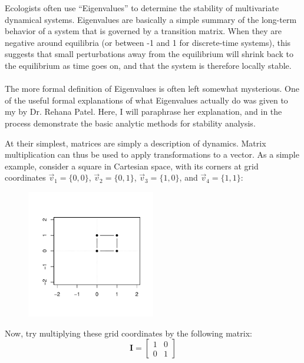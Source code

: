\documentclass[12pt]{article}
\begin{document}
\maketitle

\setcounter{equation}{0}
Ecologists often use ``Eigenvalues'' to determine the stability of multivariate dynamical systems. Eigenvalues are basically a simple summary of the long-term behavior of a system that is governed by a transition matrix. When they are negative around equilibria (or between -1 and 1 for discrete-time systems), this suggests that small perturbations away from the equilibrium will shrink back to the equilibrium as time goes on, and that the system is therefore locally stable.

\paragraph{} The more formal definition of Eigenvalues is often left somewhat mysterious. One of the useful formal explanations of what Eigenvalues actually do was given to my by Dr. Rehana Patel. Here, I will paraphrase her explanation, and in the process demonstrate the basic analytic methods for stability analysis.

At their simplest, matrices are simply a description of dynamics. Matrix multiplication can thus be used to apply transformations to a vector. As a simple example, consider a square in Cartesian space, with its corners at grid coordinates $\overrightarrow{v}_{1}=\{0,0\}$, $\overrightarrow{v}_{2}=\{0,1\}$, $\overrightarrow{v}_{3}=\{1,0\}$, and $\overrightarrow{v}_{4}=\{1,1\}$:

\begin{figure}[H]
  \centering
  \includegraphics[width=0.5\textwidth, page=1]{figures/Eigen1}
\end{figure}

Now, try multiplying these grid coordinates by the following matrix:
\begin{equation}
\textbf{I}=
\begin{bmatrix}
1 & 0 \\
0 & 1
\end{bmatrix}
\end{equation}
\end{document}
